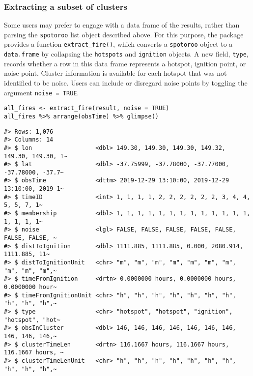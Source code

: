 \hypertarget{extracting-a-subset-of-clusters}{%
\subsubsection{Extracting a subset of clusters}\label{extracting-a-subset-of-clusters}}

Some users may prefer to engage with a data frame of the results, rather than parsing the \texttt{spotoroo} list object described above. For this purpose, the package provides a function \texttt{extract\_fire()}, which converts a \texttt{spotoroo} object to a \texttt{data.frame} by collapsing the \texttt{hotspots} and \texttt{ignition} objects. A new field, \texttt{type}, records whether a row in this data frame represents a hotspot, ignition point, or noise point. Cluster information is available for each hotspot that was not identified to be noise. Users can include or disregard noise points by toggling the argument \texttt{noise\ =\ TRUE}.

\begin{verbatim}
all_fires <- extract_fire(result, noise = TRUE)
all_fires %>% arrange(obsTime) %>% glimpse()
\end{verbatim}

\begin{verbatim}
#> Rows: 1,076
#> Columns: 14
#> $ lon                  <dbl> 149.30, 149.30, 149.30, 149.32, 149.30, 149.30, 1~
#> $ lat                  <dbl> -37.75999, -37.78000, -37.77000, -37.78000, -37.7~
#> $ obsTime              <dttm> 2019-12-29 13:10:00, 2019-12-29 13:10:00, 2019-1~
#> $ timeID               <int> 1, 1, 1, 1, 2, 2, 2, 2, 2, 2, 3, 4, 4, 5, 5, 7, 1~
#> $ membership           <dbl> 1, 1, 1, 1, 1, 1, 1, 1, 1, 1, 1, 1, 1, 1, 1, 1, 1~
#> $ noise                <lgl> FALSE, FALSE, FALSE, FALSE, FALSE, FALSE, FALSE, ~
#> $ distToIgnition       <dbl> 1111.885, 1111.885, 0.000, 2080.914, 1111.885, 11~
#> $ distToIgnitionUnit   <chr> "m", "m", "m", "m", "m", "m", "m", "m", "m", "m",~
#> $ timeFromIgnition     <drtn> 0.0000000 hours, 0.0000000 hours, 0.0000000 hour~
#> $ timeFromIgnitionUnit <chr> "h", "h", "h", "h", "h", "h", "h", "h", "h", "h",~
#> $ type                 <chr> "hotspot", "hotspot", "ignition", "hotspot", "hot~
#> $ obsInCluster         <dbl> 146, 146, 146, 146, 146, 146, 146, 146, 146, 146,~
#> $ clusterTimeLen       <drtn> 116.1667 hours, 116.1667 hours, 116.1667 hours, ~
#> $ clusterTimeLenUnit   <chr> "h", "h", "h", "h", "h", "h", "h", "h", "h", "h",~
\end{verbatim}


